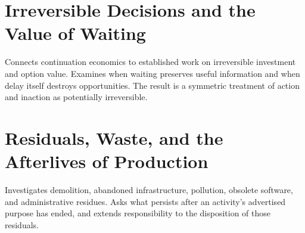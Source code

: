 \chapter{Irreversible Decisions and the Value of Waiting}\label{ch:9}
Connects continuation economics to established work on irreversible investment and option value. Examines when waiting preserves useful information and when delay itself destroys opportunities. The result is a symmetric treatment of action and inaction as potentially irreversible.
\scaffold

\chapter{Residuals, Waste, and the Afterlives of Production}\label{ch:10}
Investigates demolition, abandoned infrastructure, pollution, obsolete software, and administrative residues. Asks what persists after an activity's advertised purpose has ended, and extends responsibility to the disposition of those residuals.
\scaffold
